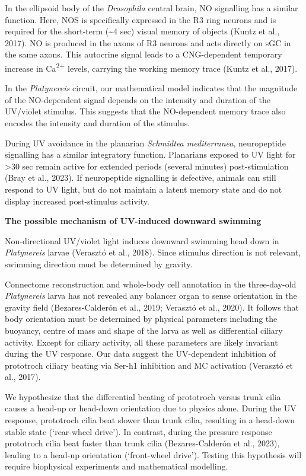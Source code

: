 \documentclass[
  10pt,
  onecolumn]{article}
\begin{document}
In the ellipsoid body of the \emph{Drosophila} central brain, NO
signalling has a similar function. Here, NOS is specifically expressed
in the R3 ring neurons and is required for the short-term
(\textasciitilde4 sec) visual memory of objects (Kuntz et al., 2017). NO
is produced in the axons of R3 neurons and acts directly on sGC in the
same axons. This autocrine signal leads to a CNG-dependent temporary
increase in Ca\textsuperscript{2+} levels, carrying the working memory
trace (Kuntz et al., 2017).

In the \emph{Platynereis} circuit, our mathematical model indicates that
the magnitude of the NO-dependent signal depends on the intensity and
duration of the UV/violet stimulus. This suggests that the NO-dependent
memory trace also encodes the intensity and duration of the stimulus.

During UV avoidance in the planarian \emph{Schmidtea mediterranea},
neuropeptide signalling has a similar integratory function. Planarians
exposed to UV light for \textgreater30 sec remain active for extended
periods (several minutes) post-stimulation (Bray et al., 2023). If
neuropeptide signalling is defective, animals can still respond to UV
light, but do not maintain a latent memory state and do not display
increased post-stimulus activity.

\textbf{The possible mechanism of UV-induced downward swimming}

Non-directional UV/violet light induces downward swimming head down in
\emph{Platynereis} larvae (Verasztó et al., 2018). Since stimulus
direction is not relevant, swimming direction must be determined by
gravity.

Connectome reconstruction and whole-body cell annotation in the
three-day-old \emph{Platynereis} larva has not revealed any balancer
organ to sense orientation in the gravity field (Bezares-Calderón et
al., 2019; Verasztó et al., 2020). It follows that body orientation must
be determined by physical parameters including the buoyancy, centre of
mass and shape of the larva as well as differential ciliary activity.
Except for ciliary activity, all these parameters are likely invariant
during the UV response. Our data suggest the UV-dependent inhibition of
prototroch ciliary beating via Ser-h1 inhibition and MC activation
(Verasztó et al., 2017).

We hypothesize that the differential beating of prototroch versus trunk
cilia causes a head-up or head-down orientation due to physics alone.
During the UV response, prototroch cilia beat slower than trunk cilia,
resulting in a head-down stable state (`rear-wheel drive'). In contrast,
during the pressure response prototroch cilia beat faster than trunk
cilia (Bezares-Calderón et al., 2023), leading to a head-up orientation
(`front-wheel drive'). Testing this hypothesis will require biophysical
experiments and mathematical modelling.
\end{document}
